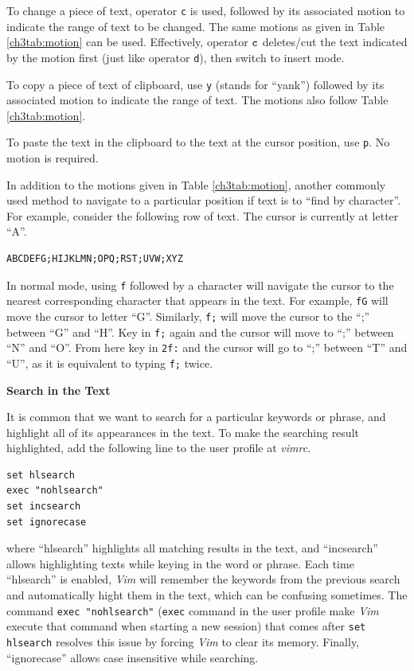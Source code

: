 To change a piece of text, operator \verb|c| is used, followed by its associated motion to indicate the range of text to be changed. The same motions as given in Table \ref{ch3tab:motion} can be used. Effectively, operator $\verb|c|$ deletes/cut the text indicated by the motion first (just like operator \verb|d|), then switch to insert mode.

To copy a piece of text of clipboard, use \verb|y| (stands for ``yank'') followed by its associated motion to indicate the range of text. The motions also follow Table \ref{ch3tab:motion}.

To paste the text in the clipboard to the text at the cursor position, use \verb|p|. No motion is required.

In addition to the motions given in Table \ref{ch3tab:motion}, another commonly used method to navigate to a particular position if text is to ``find by character''. For example, consider the following row of text. The cursor is currently at letter ``A''.
\begin{verbatim}
ABCDEFG;HIJKLMN;OPQ;RST;UVW;XYZ
\end{verbatim}
In normal mode, using \verb|f| followed by a character will navigate the cursor to the nearest corresponding character that appears in the text. For example, \verb|fG| will move the cursor to letter ``G''. Similarly, \verb|f;| will move the cursor to the ``;'' between ``G'' and ``H''. Key in \verb|f;| again and the cursor will move to ``;'' between ``N'' and ``O''. From here key in \verb|2f:| and the cursor will go to ``;'' between ``T'' and ``U'', as it is equivalent to typing \verb|f;| twice.

\vspace{0.1in}
\noindent \textbf{Search in the Text}
\vspace{0.1in}

It is common that we want to search for a particular keywords or phrase, and highlight all of its appearances in the text. To make the searching result highlighted, add the following line to the user profile at \textit{vimrc}.
\begin{verbatim}
set hlsearch
exec "nohlsearch"
set incsearch
set ignorecase
\end{verbatim}
where ``hlsearch'' highlights all matching results in the text, and ``incsearch'' allows highlighting texts while keying in the word or phrase. Each time ``hlsearch'' is enabled, \textit{Vim} will remember the keywords from the previous search and automatically hight them in the text, which can be confusing sometimes. The command \verb|exec "nohlsearch"| (\verb|exec| command in the user profile make \textit{Vim} execute that command when starting a new session) that comes after \verb|set hlsearch| resolves this issue by forcing \textit{Vim} to clear its memory. Finally, ``ignorecase'' allows case insensitive while searching.

